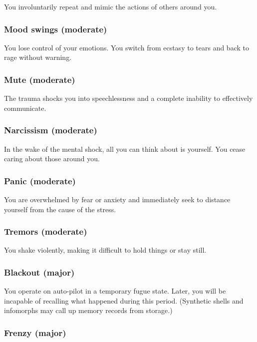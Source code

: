 You involuntarily repeat and mimic the actions of others around you.

\subsubsection{Mood swings (moderate)}

You lose control of your emotions. You switch from ecstasy to tears and back to rage without warning.

\subsubsection{Mute (moderate)}

The trauma shocks you into speechlessness and a complete inability to effectively communicate.

\subsubsection{Narcissism (moderate)}

In the wake of the mental shock, all you can think about is yourself. You cease caring about those around you.

\subsubsection{Panic (moderate)}

You are overwhelmed by fear or anxiety and immediately seek to distance yourself from the cause of the stress.

\subsubsection{Tremors (moderate)}

You shake violently, making it difficult to hold things or stay still.

\subsubsection{Blackout (major)}

You operate on auto-pilot in a temporary fugue state. Later, you will be incapable of recalling what happened during this period. (Synthetic shells and infomorphs may call up memory records from storage.)

\subsubsection{Frenzy (major)}

